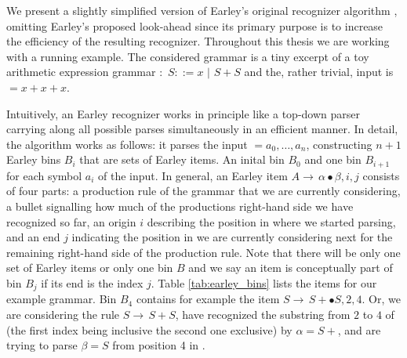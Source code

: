 %
\begin{isabellebody}%
%
%
\isadelimtheory
%
\endisadelimtheory
%
\isatagtheory
%
\endisatagtheory
{\isafoldtheory}%
%
\isadelimtheory
%
\endisadelimtheory
%
\isadelimdocument
%
\endisadelimdocument
%
\isatagdocument
%
\isamarkuptrue%
%
\endisatagdocument
{\isafolddocument}%
%
\isadelimdocument
%
\endisadelimdocument
%
\begin{isamarkuptext}%
We present a slightly simplified version of Earley's original recognizer algorithm \cite{Earley:1970},
omitting Earley's proposed look-ahead since its primary purpose is to increase the efficiency of the
resulting recognizer. Throughout this thesis we are working with a running example. The considered grammar is a tiny excerpt of a toy
arithmetic expression grammar \isa{{\isasymG}}: $\, S ::= x \,\, \vert \,\, S + S$ and
the, rather trivial, input is \isa{{\isasymomega}} $= x + x + x$.

Intuitively, an Earley recognizer works in principle like a top-down parser carrying along all possible
parses simultaneously in an efficient manner.
In detail, the algorithm works as follows: it parses the input \isa{{\isasymomega}} $=a_0,\dots,a_n$, constructing
$n+1$ Earley bins $B_i$ that are sets of Earley items. An inital bin $B_0$ and one bin $B_{i+1}$ for
each symbol $a_i$ of the input.
In general, an Earley item $A \rightarrow \, \alpha \bullet \beta, i, j$ consists of four parts: a production rule of the grammar that we are currently
considering, a bullet signalling how much of the productions right-hand side we have recognized so far,
an origin $i$ describing the position in \isa{{\isasymomega}} where we started parsing, and an end $j$ indicating
the position in \isa{{\isasymomega}} we are currently considering next for the remaining right-hand side of the production rule.
Note that there will be only one set of Earley items or only one bin $B$ and we say an item is conceptually part of bin $B_j$ if its end is the index $j$.
Table \ref{tab:earley_bins} lists the items for our example grammar. Bin $B_4$ contains for example the item $S \rightarrow \, S + \bullet S, 2, 4$.
Or, we are considering the rule $S \rightarrow \, S + S$, have recognized the substring from $2$ to $4$ of \isa{{\isasymomega}} (the first index being
inclusive the second one exclusive) by $\alpha = S +$, and are trying to parse $\beta = S$ from position 4 in \omega. 


\end{isamarkuptext}
\end{isabellebody}
